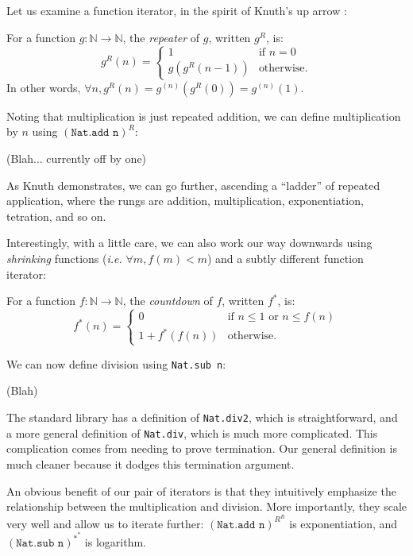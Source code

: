 
Let us examine a function iterator, in the spirit of Knuth's up arrow 
\cite{knuth_up_arrow}: 

\begin{defn} \label{defn:repeater}
For a function $g: \mathbb{N} \to \mathbb{N}$, 
the \textit{repeater} of $g$, written $g^R$, is:
\begin{equation}
g^R(n) = \begin{cases}
1 & \text{if } n = 0 \\ 
g \left( g^R (n - 1) \right) & \text{otherwise.}
\end{cases}
\end{equation}
{\color{magenta}In other words, 
$\forall n, g^R(n) = g^{(n)}\left(g^R(0)\right) = g^{(n)}(1)$}.
\end{defn}

Noting that multiplication is just repeated addition, 
we can define multiplication by $n$ using $(\texttt{Nat.add n})^R$:

(Blah... currently off by one)

As Knuth demonstrates, we can go further, ascending a 
``ladder'' of repeated application, where the 
rungs are addition, multiplication, exponentiation, 
tetration, and so on.

Interestingly, with a little care, we can also work our way
downwards using \textit{shrinking} functions
(\emph{i.e.} $\forall m, f(m) < m$) and a subtly different 
function iterator:

\begin{defn} \label{defn:countdown}
For a function $f: \mathbb{N} \to \mathbb{N}$,
the \textit{countdown} of $f$, written $f^*$, is:
\begin{equation} \label{eq: countdown}
f^*(n) = \begin{cases}
0 & \text{if } n \le 1 \text{ or } n \le f(n) \\
1 + f^*(f(n)) & \text{otherwise.}
\end{cases}
\end{equation}
\end{defn}

We can now define division using \texttt{Nat.sub n}:

(Blah)

The standard library has a definition of \texttt{Nat.div2},
which is straightforward, and a more general definition 
of \texttt{Nat.div}, which is much more complicated. This 
complication comes from needing to prove termination. Our 
general definition is much cleaner because it dodges this 
termination argument. 


An obvious benefit of our pair of iterators is that they
intuitively emphasize the relationship between the multiplication 
and division. More importantly, they scale very well and allow us
to iterate further: $(\texttt{Nat.add n})^{R^R}$ is exponentiation, 
and $(\texttt{Nat.sub n})^{*^*}$ is logarithm.

